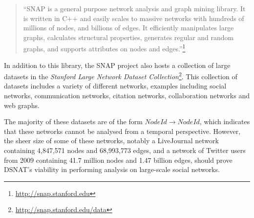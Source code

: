 \begin{quote}
``SNAP is a general purpose network analysis and graph mining library. It is written in C++ and easily scales to massive networks with hundreds of millions of nodes, and billions of edges. It efficiently manipulates large graphs, calculates structural properties, generates regular and random graphs, and supports attributes on nodes and edges.''\footnote{\url{http://snap.stanford.edu}}
\end{quote}

In addition to this library, the SNAP project also hosts a collection of large datasets in the \emph{Stanford Large Network Dataset Collection}\footnote{\url{http://snap.stanford.edu/data}}. This collection of datasets includes a variety of different networks, examples including social networks, communication networks, citation networks, collaboration networks and web graphs.

The majority of these datasets are of the form $NodeId \rightarrow NodeId$, which indicates that these networks cannot be analysed from a temporal perspective. However, the sheer size of some of these networks, notably a LiveJournal network containing 4,847,571 nodes and 68,993,773 edges, and a network of Twitter users from 2009 \cite{kwak10} containing 41.7 million nodes and 1.47 billion edges, should prove DSNAT's viability in performing analysis on large-scale social networks.